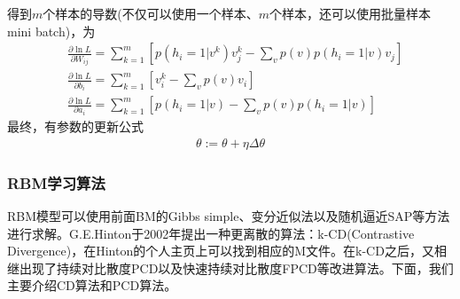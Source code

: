            得到$m$个样本的导数(不仅可以使用一个样本、$m$个样本，还可以使用批量样本mini batch)，为
            \begin{align*}
            &\frac{\partial \ln L}{\partial W_{ij}} = \sum_{k=1}^m \left[ p(h_i=1|v^k)v_j^k - \sum_vp(v)p(h_i = 1|v)v_j \right]\\
            &\frac{\partial \ln L}{\partial b_i} = \sum_{k=1}^m \left[ v_i^k- \sum_vp(v)v_i \right]\\
            &\frac{\partial \ln L}{\partial a_i} = \sum_{k=1}^m \left[  p(h_i=1|v) - \sum_vp(v)p(h_i=1|v) \right]
            \end{align*}
            最终，有参数的更新公式
            \begin{align*}
            \theta :=\theta + \eta\Delta\theta
            \end{align*}

        \subsubsection{RBM学习算法}
            \par
            RBM模型可以使用前面BM的Gibbs simple、变分近似法以及随机逼近SAP等方法进行求解。G.E.Hinton于2002年提出一种更离散的算法：k-CD(Contrastive Divergence)，在Hinton的个人主页上可以找到相应的M文件。在k-CD之后，又相继出现了持续对比散度PCD以及快速持续对比散度FPCD等改进算法。下面，我们主要介绍CD算法和PCD算法。

